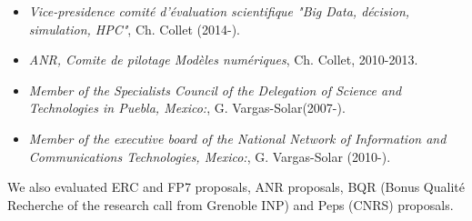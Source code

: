 \begin{itemize}
\setlength{\itemindent}{-0.5cm}
\setlength{\itemsep}{-0.1cm}

\item {\it Vice-presidence  comit{\'e} d'{\'e}valuation scientifique  "Big Data, d{\'e}cision, simulation, HPC"},   Ch. Collet (2014-).

\item {\it ANR, Comite  de pilotage Mod{\`e}les num{\'e}riques}, Ch. Collet, 2010-2013.

\item {\it Member of the Specialists Council of the Delegation of Science and Technologies in Puebla, Mexico:}, G. Vargas-Solar(2007-).

\item {\it Member of the executive board of the National Network of Information and Communications Technologies, Mexico:}, G. Vargas-Solar (2010-).








\end{itemize}

We also evaluated ERC and  FP7 proposals, ANR proposals, BQR (Bonus Qualit{\'e} Recherche of the research call from Grenoble INP) and Peps (CNRS) proposals. 

